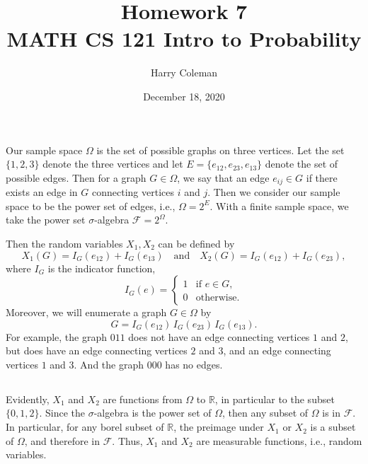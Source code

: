 \documentclass[12pt]{article}
\newcommand{\isp}[1]{\quad\text{#1}\quad}
\newcommand{\R}{\mathbb{R}}
\newcommand{\FF}{\mathcal{F}}
\begin{document}
 
\title{Homework 7\\
    \large MATH CS 121 Intro to Probability
}
\author{Harry Coleman}
\date{December 18, 2020}
\maketitle

\section{}

Our sample space $\Omega$ is the set of possible graphs on three vertices. Let the set $\{1, 2, 3\}$ denote the three vertices and let $E = \{e_{12}, e_{23}, e_{13}\}$ denote the set of possible edges. Then for a graph $G \in \Omega$, we say that an edge $e_{ij} \in G$ if there exists an edge in $G$ connecting vertices $i$ and $j$. Then we consider our sample space to be the power set of edges, i.e., $\Omega = 2^E$. With a finite sample space, we take the power set $\sigma$-algebra $\FF = 2^\Omega$.

Then the random variables $X_1, X_2$ can be defined by
\[
    X_1(G) = I_G(e_{12}) + I_G(e_{13}) \isp{and} X_2(G) = I_G(e_{12}) + I_G(e_{23}),
\]
where $I_G$ is the indicator function,
\[
    I_G(e) = \begin{cases}
        1 &\text{if $e \in G$,} \\
        0 &\text{otherwise.}
    \end{cases}
\]
Moreover, we will enumerate a graph $G \in \Omega$ by
\[
    G = I_G(e_{12})\, I_G(e_{23})\, I_G(e_{13}).
\]
For example, the graph $011$ does not have an edge connecting vertices $1$ and $2$, but does have an edge connecting vertices $2$ and $3$, and an edge connecting vertices $1$ and $3$. And the graph $000$ has no edges.

\subsection{}

Evidently, $X_1$ and $X_2$ are functions from $\Omega$ to $\R$, in particular to the subset $\{0, 1, 2\}$. Since the $\sigma$-algebra is the power set of $\Omega$, then any subset of $\Omega$ is in $\FF$. In particular, for any borel subset of $\R$, the preimage under $X_1$ or $X_2$ is a subset of $\Omega$, and therefore in $\FF$. Thus, $X_1$ and $X_2$ are measurable functions, i.e., random variables.

\subsection{}
\end{document}
